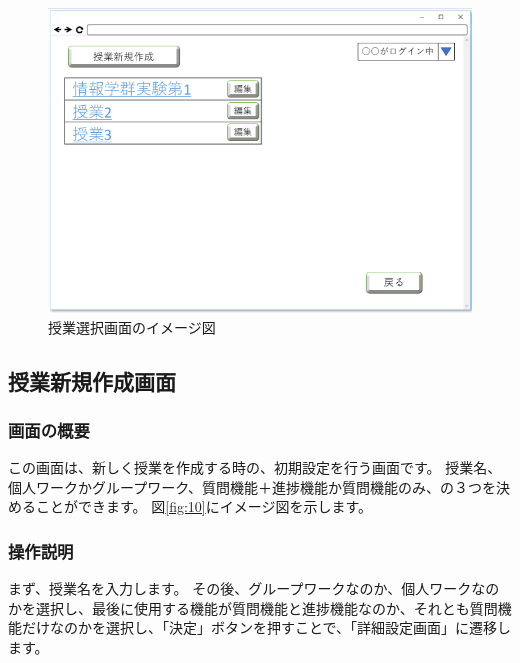 \begin{figure}[htbp]
  \begin{center}
    \includegraphics[width=1\linewidth,clip]{./img/09.png}
    \caption{授業選択画面のイメージ図}\label{fig:09}
  \end{center}
\end{figure}

\newpage

\subsection{授業新規作成画面}
\subsubsection{画面の概要}
この画面は、新しく授業を作成する時の、初期設定を行う画面です。
授業名、個人ワークかグループワーク、質問機能＋進捗機能か質問機能のみ、の３つを決めることができます。
図\ref{fig:10}にイメージ図を示します。

\subsubsection{操作説明}
まず、授業名を入力します。
その後、グループワークなのか、個人ワークなのかを選択し、最後に使用する機能が質問機能と進捗機能なのか、それとも質問機能だけなのかを選択し、「決定」ボタンを押すことで、「詳細設定画面」に遷移します。

